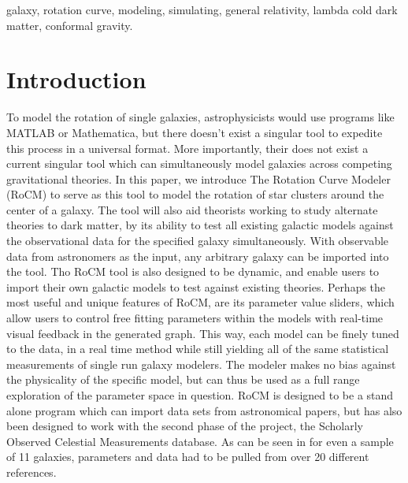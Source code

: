 \documentclass[conference]{IEEEtran-modified}
\begin{document}
	
	\begin{IEEEkeywords}
	\begin{center}
	galaxy, rotation curve, modeling, simulating, general relativity, lambda cold dark matter, conformal gravity.
	\end{center}	
	\end{IEEEkeywords}
	
	
	\IEEEpeerreviewmaketitle
\thispagestyle{plain}
\pagestyle{plain}

\section{Introduction}
To model the rotation of single galaxies, astrophysicists would use programs like MATLAB or Mathematica, but there doesn't exist a singular tool to expedite this process in a universal format.   More importantly, their does not exist a current singular tool which can simultaneously model galaxies across competing gravitational theories.  In this paper, we introduce The Rotation Curve Modeler (RoCM) to serve as this tool to model the rotation of star clusters around the center of a galaxy. The tool will also aid theorists working to study alternate theories to dark matter, by its ability to test all existing galactic models against the observational data for the specified galaxy simultaneously. With observable data from astronomers as the input, any arbitrary galaxy can be imported into the tool. Tho RoCM tool is also designed to be dynamic, and enable users to import their own galactic models to test against existing theories.  Perhaps the most useful and unique features of RoCM, are its parameter value sliders, which allow users to control free fitting parameters within the models with real-time visual feedback in the generated graph. This way, each model can be finely tuned to the data, in a real time method while still yielding all of the same statistical measurements of single run galaxy modelers. The modeler makes no bias against the physicality of the specific model, but can thus be used as a full range exploration of the parameter space in question.  RoCM is designed to be a stand alone program which can import data sets from astronomical papers, but has also been designed to work with the second phase of the project, the Scholarly Observed Celestial Measurements database. As can be seen in \cite{impact} for even a sample of 11 galaxies, parameters and data had to be pulled from over 20 different references.  

\end{document}
